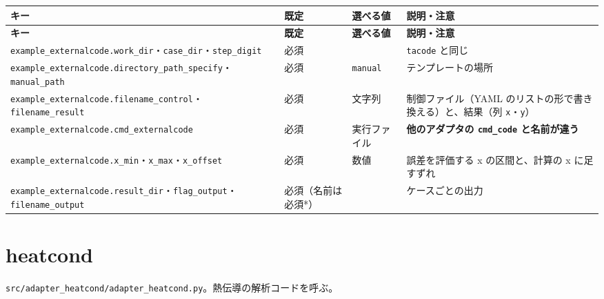 \begingroup\small
\begin{longtable}{>{\raggedright\arraybackslash}p{}>{\raggedright\arraybackslash}p{}>{\raggedright\arraybackslash}p{}>{\raggedright\arraybackslash}p{}}
\toprule
\textbf{キー} & \textbf{既定} & \textbf{選べる値} & \textbf{説明・注意} \\
\midrule
\endfirsthead
\toprule
\textbf{キー} & \textbf{既定} & \textbf{選べる値} & \textbf{説明・注意} \\
\midrule
\endhead
\bottomrule
\endlastfoot
\texttt{example\_\allowbreak{}externalcode.\allowbreak{}work\_\allowbreak{}dir}・\texttt{case\_\allowbreak{}dir}・\texttt{step\_\allowbreak{}digit} & 必須 &  & \texttt{tacode} と同じ \\
\texttt{example\_\allowbreak{}externalcode.\allowbreak{}directory\_\allowbreak{}path\_\allowbreak{}specify}・\texttt{manual\_\allowbreak{}path} & 必須 & \texttt{manual} & テンプレートの場所 \\
\texttt{example\_\allowbreak{}externalcode.\allowbreak{}filename\_\allowbreak{}control}・\texttt{filename\_\allowbreak{}result} & 必須 & 文字列 & 制御ファイル（YAML のリストの形で書き換える）と、結果（列 \texttt{x}・\texttt{y}） \\
\texttt{example\_\allowbreak{}externalcode.\allowbreak{}cmd\_\allowbreak{}externalcode} & 必須 & 実行ファイル & \textbf{他のアダプタの \texttt{cmd\_\allowbreak{}code} と名前が違う} \\
\texttt{example\_\allowbreak{}externalcode.\allowbreak{}x\_\allowbreak{}min}・\texttt{x\_\allowbreak{}max}・\texttt{x\_\allowbreak{}offset} & 必須 & 数値 & 誤差を評価する x の区間と、計算の x に足すずれ \\
\texttt{example\_\allowbreak{}externalcode.\allowbreak{}result\_\allowbreak{}dir}・\texttt{flag\_\allowbreak{}output}・\texttt{filename\_\allowbreak{}output} & 必須（名前は必須*） &  & ケースごとの出力 \\
\end{longtable}
\endgroup

\section{heatcond}

\texttt{src/\allowbreak{}adapter\_\allowbreak{}heatcond/\allowbreak{}adapter\_\allowbreak{}heatcond.\allowbreak{}py}。熱伝導の解析コードを呼ぶ。

